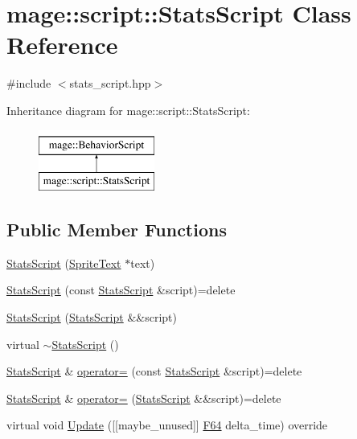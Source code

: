 \hypertarget{classmage_1_1script_1_1_stats_script}{}\section{mage\+:\+:script\+:\+:Stats\+Script Class Reference}
\label{classmage_1_1script_1_1_stats_script}


{\ttfamily \#include $<$stats\+\_\+script.\+hpp$>$}

Inheritance diagram for mage\+:\+:script\+:\+:Stats\+Script\+:\begin{figure}[H]
\begin{center}
\leavevmode
\includegraphics[height=2.000000cm]{classmage_1_1script_1_1_stats_script}
\end{center}
\end{figure}
\subsection*{Public Member Functions}
\begin{DoxyCompactItemize}
\item 
\hyperlink{classmage_1_1script_1_1_stats_script_ad03d10952f46b88d2b3a55acbff11240}{Stats\+Script} (\hyperlink{classmage_1_1_sprite_text}{Sprite\+Text} $\ast$text)
\item 
\hyperlink{classmage_1_1script_1_1_stats_script_aae7cec6358e2e3ebd36f922f106627d8}{Stats\+Script} (const \hyperlink{classmage_1_1script_1_1_stats_script}{Stats\+Script} \&script)=delete
\item 
\hyperlink{classmage_1_1script_1_1_stats_script_ade098c40acffbe1089664564411dd589}{Stats\+Script} (\hyperlink{classmage_1_1script_1_1_stats_script}{Stats\+Script} \&\&script)
\item 
virtual \hyperlink{classmage_1_1script_1_1_stats_script_a5b9b30aa6939968c2aee8cdf11f6486c}{$\sim$\+Stats\+Script} ()
\item 
\hyperlink{classmage_1_1script_1_1_stats_script}{Stats\+Script} \& \hyperlink{classmage_1_1script_1_1_stats_script_ad33bbb402575b5abcb2639817d27b180}{operator=} (const \hyperlink{classmage_1_1script_1_1_stats_script}{Stats\+Script} \&script)=delete
\item 
\hyperlink{classmage_1_1script_1_1_stats_script}{Stats\+Script} \& \hyperlink{classmage_1_1script_1_1_stats_script_a5eecd80eef17414d566c7d7c77b3dbce}{operator=} (\hyperlink{classmage_1_1script_1_1_stats_script}{Stats\+Script} \&\&script)=delete
\item 
virtual void \hyperlink{classmage_1_1script_1_1_stats_script_a0af94632cf9d5c32ae45799a2348c571}{Update} (\mbox{[}\mbox{[}maybe\+\_\+unused\mbox{]}\mbox{]} \hyperlink{namespacemage_ad26233bbec640deda836e572c1a23708}{F64} delta\+\_\+time) override
\end{DoxyCompactItemize}
